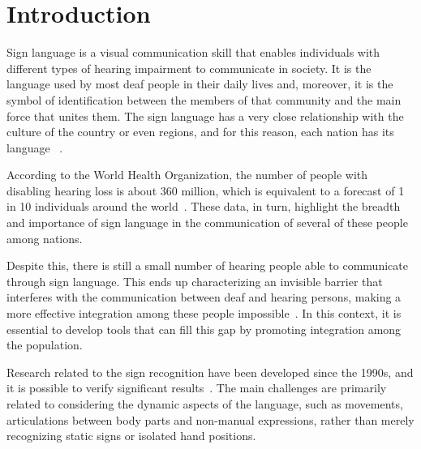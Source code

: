 \section{Introduction} 
\label{sec:introduction}

Sign language is a visual communication skill that enables individuals with different types of hearing impairment to communicate in society. It is the language used by most deaf people in their daily lives and, moreover, it is the symbol of identification between the members of that community and the main force that unites them.  The sign language has a very close relationship with the culture of the country or even regions, and for this reason, each nation has its language ~\cite{pereira-choi-2011}.

According to the World Health Organization, the number of people with disabling hearing loss is about 360 million, which is equivalent to a forecast of 1 in 10 individuals around the world~\cite{who-2018}. These data, in turn, highlight the breadth and importance of sign language in the communication of several of these people among nations.

Despite this, there is still a small number of hearing people able to communicate through sign language. This ends up characterizing an invisible barrier that interferes with the communication between deaf and hearing persons, making a more effective integration among these people impossible~\cite{peres-2006}. In this context, it is essential to develop tools that can fill this gap by promoting integration among the population.

Research related to the sign recognition have been developed since the 1990s, and it is possible to verify significant results~\cite{lim-2016,recent-advances-dl-2017}. The main challenges are primarily related to considering the dynamic aspects of the language, such as movements, articulations between body parts and non-manual expressions, rather than merely recognizing static signs or isolated hand positions. %


